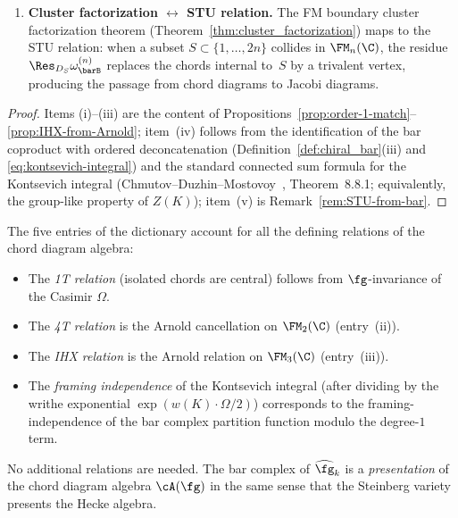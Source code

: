 \begin{proposition}
\begin{enumerate}[label=\textup{(\roman*)}]
\item \textbf{Cluster factorization $\longleftrightarrow$
 STU relation.}
 The FM boundary cluster factorization theorem
 (Theorem~\ref{thm:cluster_factorization}) maps to the STU
 relation: when a subset $S \subset \{1, \ldots, 2n\}$
 collides in $\FM_n(\C)$, the residue
 $\Res_{D_S} \omega_{\barB}^{(n)}$ replaces the chords
 internal to~$S$ by a trivalent vertex, producing the
 passage from chord diagrams to Jacobi diagrams.
\end{enumerate}
\end{proposition}

\begin{proof}
Items (i)--(iii) are the content of
Propositions~\ref{prop:order-1-match}--\ref{prop:IHX-from-Arnold};
item~(iv) follows from the identification of the bar coproduct
with ordered deconcatenation
(Definition~\ref{def:chiral_bar}(iii) and
\eqref{eq:kontsevich-integral}) and the standard connected sum
formula for the Kontsevich integral
(Chmutov--Duzhin--Mostovoy~\cite{CDM12}, Theorem~8.8.1;
equivalently, the group-like property of $Z(K)$); item~(v) is
Remark~\ref{rem:STU-from-bar}.
\end{proof}

\begin{remark}
\label{rem:dictionary-completeness}
The five entries of the dictionary account for all the defining
relations of the chord diagram algebra:
\begin{itemize}
\item The \emph{1T relation} (isolated chords are central)
 follows from $\fg$-invariance of the Casimir $\Omega$.
\item The \emph{4T relation} is the Arnold cancellation on
 $\FM_2(\C)$ (entry~(ii)).
\item The \emph{IHX relation} is the Arnold relation on
 $\FM_3(\C)$ (entry~(iii)).
\item The \emph{framing independence} of the Kontsevich integral
 (after dividing by the writhe exponential
 $\exp(w(K) \cdot \Omega/2)$) corresponds to the
 framing-independence of the bar complex partition function
 modulo the degree-$1$ term.
\end{itemize}
No additional relations are needed. The bar complex of
$\widehat{\fg}_k$ is a \emph{presentation} of the chord diagram
algebra $\cA(\fg)$ in the same sense that the Steinberg variety
presents the Hecke algebra.
\end{remark}

